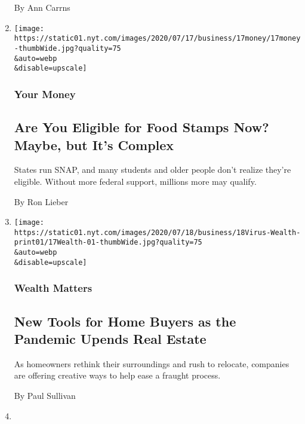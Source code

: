 \begin{enumerate}
  By Ann Carrns
\item
  \href{/2020/07/17/your-money/food-stamps-coronavirus.html}{}

  \texttt{[image: https://static01.nyt.com/images/2020/07/17/business/17money/17money-thumbWide.jpg?quality=75\\\&auto=webp\\\&disable=upscale]}

  \hypertarget{your-money-1}{%
  \subsubsection{Your Money}\label{your-money-1}}

  \hypertarget{are-you-eligible-for-food-stamps-now-maybe-but-its-complex}{%
  \subsection{Are You Eligible for Food Stamps Now? Maybe, but It's
  Complex}\label{are-you-eligible-for-food-stamps-now-maybe-but-its-complex}}

  States run SNAP, and many students and older people don't realize
  they're eligible. Without more federal support, millions more may
  qualify.

  By Ron Lieber
\item
  \href{/2020/07/17/your-money/real-estate-relocation-coronavirus.html}{}

  \texttt{[image: https://static01.nyt.com/images/2020/07/18/business/18Virus-Wealth-print01/17Wealth-01-thumbWide.jpg?quality=75\\\&auto=webp\\\&disable=upscale]}

  \hypertarget{wealth-matters-2}{%
  \subsubsection{Wealth Matters}\label{wealth-matters-2}}

  \hypertarget{new-tools-for-home-buyers-as-the-pandemic-upends-real-estate}{%
  \subsection{New Tools for Home Buyers as the Pandemic Upends Real
  Estate}\label{new-tools-for-home-buyers-as-the-pandemic-upends-real-estate}}

  As homeowners rethink their surroundings and rush to relocate,
  companies are offering creative ways to help ease a fraught process.

  By Paul Sullivan
\item
  \href{/2020/07/16/your-money/fiduciary-duty-investments-best-interest.html}{}


\end{enumerate}
